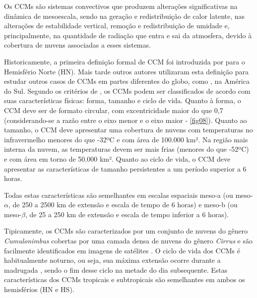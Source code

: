 Os CCMs são sistemas convectivos que produzem alterações significativas na dinâmica de mesoescala, sendo na geração e redistribuição de calor latente, nas alterações de estabilidade vertical, remoção e redistribuição de umidade e, principalmente, na quantidade de radiação que entra e sai da atmosfera, devido à cobertura de nuvens associadas a esses sistemas.

Historicamente, a primeira definição formal de CCM foi introduzida por  para o Hemisfério Norte (HN). Mais tarde outros autores utilizaram esta definição para estudar outros casos de CCMs em partes diferentes do globo, como \cite{velascofritsch87}, na América do Sul. Segundo os critérios de \cite{maddox80}, os CCMs podem ser classificados de acordo com suas características físicas: forma, tamanho e ciclo de vida. Quanto à forma, o CCM deve ser de formato circular, com excentricidade maior do que 0,7 (considerando-se a razão entre o eixo menor e o eixo maior - \autoref{fig08}). Quanto ao tamanho, o CCM deve apresentar uma cobertura de nuvens com temperaturas no infravermelho menores do que -32ºC e com área de 100.000 km². Na região mais interna da nuvem, as temperaturas devem ser mais frias (menores do que -52ºC) e com área em torno de 50.000 km². Quanto ao ciclo de vida, o CCM deve apresentar as características de tamanho persistentes a um período superior a 6 horas.

Todas estas características são semelhantes em escalas espaciais meso-a (ou meso-$\alpha$, de 250 a 2500 km de extensão e escala de tempo de 6 horas) e meso-b (ou meso-$\beta$, de 25 a 250 km de extensão e escala de tempo inferior a 6 horas).

Tipicamente, os CCMs são caracterizados por um conjunto de nuvens do gênero \textit{Cumulonimbus} cobertas por uma camada densa de nuvens do gênero \textit{Cirrus} e são facilmente identificados em imagens de satélites \cite{silvadias87}. O ciclo de vida dos CCMs é habitualmente noturno, ou seja, sua máxima extensão ocorre durante a madrugada \cite{velascofritsch87}, sendo o fim desse ciclo na metade do dia subsequente. Estas características dos CCMs tropicais e subtropicais são semelhantes em ambos os hemisférios (HN e HS).

